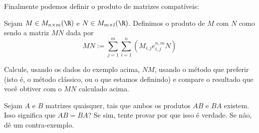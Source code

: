 Finalmente podemos definir o produto de matrizes compatíveis:
\begin{df}
	Sejam $M\in M_{n\times m}(\R)$ e $N\in M_{m\times l}(\R)$. Definimos o produto de $M$ com $N$ como sendo a matriz $MN$ dada por
	\[MN:=\sum_{j=1}^m\sum_{i=1}^n\left(M_{i,j}e^{n,m}_{i,j}N\right)\]
\end{df}

\begin{exerc}
	Calcule, usando os dados do exemplo acima, $NM$, usando o método que preferir (isto é, o método clássico, ou o que estamos definindo) e compare o resultado que você obtiver com o $MN$ calculado acima.
\end{exerc}
\begin{exerc}
	Sejam $A$ e $B$ matrizes quaisquer, tais que ambos os produtos $AB$ e $BA$ existem. Isso significa que $AB=BA$? Se sim, tente provar por que isso é verdade. Se não, dê um contra-exemplo.
\end{exerc}

